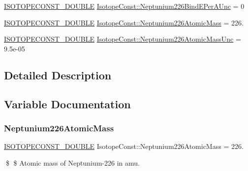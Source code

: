 \begin{DoxyCompactItemize}
\mbox{\hyperlink{group___isotope_const-_macros_ga8f45a7272ce02c0b4c65c44636ed719a}{I\+S\+O\+T\+O\+P\+E\+C\+O\+N\+S\+T\+\_\+\+D\+O\+U\+B\+LE}} \mbox{\hyperlink{group___isotope_const-_neptunium-_np226_ga374506e156e5c340d0867a5bbf599eef}{Isotope\+Const\+::\+Neptunium226\+Bind\+E\+Per\+A\+Unc}} = 0
\item 
\mbox{\hyperlink{group___isotope_const-_macros_ga8f45a7272ce02c0b4c65c44636ed719a}{I\+S\+O\+T\+O\+P\+E\+C\+O\+N\+S\+T\+\_\+\+D\+O\+U\+B\+LE}} \mbox{\hyperlink{group___isotope_const-_neptunium-_np226_gac8c24ee917d40db7a84bee55c047a466}{Isotope\+Const\+::\+Neptunium226\+Atomic\+Mass}} = 226.
\item 
\mbox{\hyperlink{group___isotope_const-_macros_ga8f45a7272ce02c0b4c65c44636ed719a}{I\+S\+O\+T\+O\+P\+E\+C\+O\+N\+S\+T\+\_\+\+D\+O\+U\+B\+LE}} \mbox{\hyperlink{group___isotope_const-_neptunium-_np226_ga16b7f7022b73635a22b2a8c9b52c87a0}{Isotope\+Const\+::\+Neptunium226\+Atomic\+Mass\+Unc}} = 9.\+5e-\/05
\end{DoxyCompactItemize}


\subsection{Detailed Description}


\subsection{Variable Documentation}
\mbox{\label{group___isotope_const-_neptunium-_np226_gac8c24ee917d40db7a84bee55c047a466}} 
\subsubsection{\texorpdfstring{Neptunium226\+Atomic\+Mass}{Neptunium226AtomicMass}}
{\footnotesize\ttfamily \mbox{\hyperlink{group___isotope_const-_macros_ga8f45a7272ce02c0b4c65c44636ed719a}{I\+S\+O\+T\+O\+P\+E\+C\+O\+N\+S\+T\+\_\+\+D\+O\+U\+B\+LE}} Isotope\+Const\+::\+Neptunium226\+Atomic\+Mass = 226.}

\$ \$ Atomic mass of Neptunium-\/226 in amu. \mbox{\label{group___isotope_const-_neptunium-_np226_ga16b7f7022b73635a22b2a8c9b52c87a0}} 
